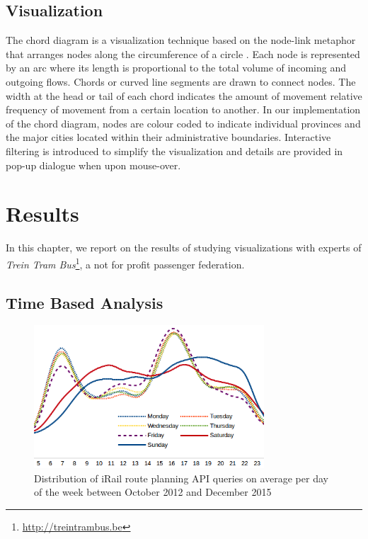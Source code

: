 \documentclass{sig-alternate}
\begin{document}
\subsection{Visualization}\label{sec:vis}
The chord diagram is a visualization technique based on the node-link metaphor that arranges nodes along the circumference of a circle \cite{krzywinski2009circos}. 
Each node is represented by an arc where its length is proportional to the total volume of incoming and outgoing flows. 
Chords or curved line segments are drawn to connect nodes. 
The width at the head or tail of each chord indicates the amount of movement relative frequency of movement from a certain location to another.
In our implementation of the chord diagram, nodes are colour coded to indicate individual provinces and the major cities located within their administrative boundaries. 
Interactive filtering is introduced to simplify the visualization and details are provided in pop-up dialogue when upon mouse-over.

\section{Results}
\label{sec:results}

In this chapter, we report on the results of studying visualizations with experts of \emph{Trein Tram Bus}\footnote{\url{http://treintrambus.be}}, a not for profit passenger federation.

\subsection{Time Based Analysis}
\begin{figure}[h]
\centering
\includegraphics[width=8.6cm]{avg-all}
\caption{Distribution of iRail route planning API queries on average per day of the week between October 2012 and December 2015}
\label{fig:average}
\end{figure}
\end{document}
